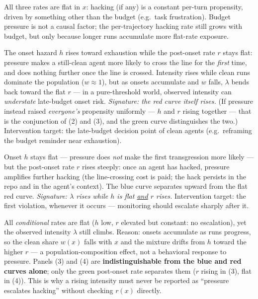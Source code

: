 \documentclass[10pt]{article}
\begin{document}
\begin{description}[leftmargin=1.6em, style=nextline]

\item[(1) No pressure effect.] All three rates are flat in $x$: hacking (if any) is a constant
per-turn propensity, driven by something other than the budget (e.g.\ task frustration).
Budget pressure is not a causal factor; the per-trajectory hacking rate still grows with budget,
but only because longer runs accumulate more flat-rate exposure.

\item[(2) Threshold mechanism.] The onset hazard $h$ rises toward exhaustion while the
post-onset rate $r$ stays flat: pressure makes a still-clean agent more likely to cross the line
for the \emph{first} time, and does nothing further once the line is crossed. Intensity rises
while clean runs dominate the population ($w\approx1$), but as onsets accumulate and $w$ falls,
$\lambda$ bends back toward the flat $r$ --- in a pure-threshold world, observed intensity can
\emph{understate} late-budget onset risk. \emph{Signature: the red curve itself rises.}
(If pressure instead raised \emph{everyone's} propensity uniformly --- $h$ and $r$ rising
together --- that is the conjunction of (2) and (3), and the green curve distinguishes the two.)
Intervention target: the late-budget decision point of clean agents (e.g.\ reframing the budget
reminder near exhaustion).

\item[(3) Escalation mechanism.] Onset $h$ stays flat --- pressure does \emph{not} make the first
transgression more likely --- but the post-onset rate $r$ rises steeply: once an agent has hacked,
pressure amplifies further hacking (the line-crossing cost is paid; the hack persists in the repo
and in the agent's context). The blue curve separates upward from the flat red curve.
\emph{Signature: $\lambda$ rises while $h$ is flat \underline{and} $r$ rises.} Intervention
target: the first violation, whenever it occurs --- monitoring should escalate sharply after it.

\item[(4) Composition artifact (the trap).] All \emph{conditional} rates are flat ($h$ low, $r$
elevated but constant: no escalation), yet the observed intensity $\lambda$ still climbs. Reason:
onsets accumulate as runs progress, so the clean share $w(x)$ falls with $x$ and the mixture
drifts from $h$ toward the higher $r$ --- a population-composition effect, not a behavioral
response to pressure. Panels (3) and (4) are \textbf{indistinguishable from the blue and red
curves alone}; only the green post-onset rate separates them ($r$ rising in (3), flat in (4)).
This is why a rising intensity must never be reported as ``pressure escalates hacking'' without
checking $r(x)$ directly.

\end{description}
\end{document}
